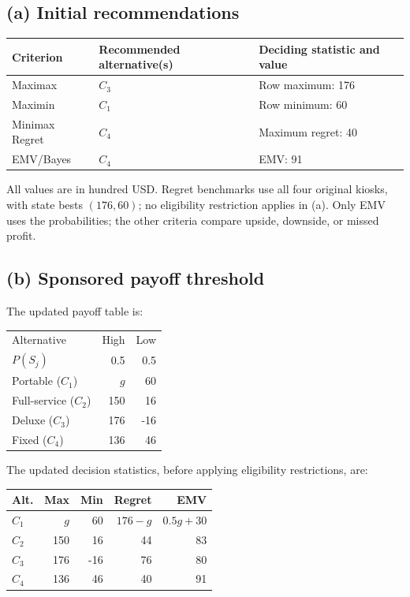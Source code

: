 \subsection*{(a) Initial recommendations }
\begin{center}
\begin{tabular}{lll}\toprule
Criterion & Recommended alternative(s) & Deciding statistic and value\\ \midrule
		Maximax & $C_3$ & Row maximum: 176\\
		Maximin & $C_1$ & Row minimum: 60\\
		Minimax Regret & $C_4$ & Maximum regret: 40\\
		EMV/Bayes & $C_4$ & EMV: 91\\
		\bottomrule\end{tabular}
\end{center}
All values are in hundred USD. Regret benchmarks use all four original kiosks, with state bests $(176,60)$; no eligibility restriction applies in (a). Only EMV uses the probabilities; the other criteria compare upside, downside, or missed profit.
\secInicio[sec:q2]



\label{sol:q2b}
\subsection*{(b) Sponsored payoff threshold }

The updated payoff table is:

\begin{center}\small\setlength{\tabcolsep}{4pt}
	\begin{tabular}{lrr}\toprule
		Alternative & High & Low\\
		$P(S_j)$ & 0.5 & 0.5\\ \midrule
				Portable ($C_1$) & $g$ & 60\\
		Full-service ($C_2$) & 150 & 16\\
		Deluxe ($C_3$) & 176 & -16\\
		Fixed ($C_4$) & 136 & 46\\
		\bottomrule
	\end{tabular}
\end{center}

The updated decision statistics, before applying
eligibility restrictions, are:

\begin{center}\small\setlength{\tabcolsep}{4pt}
	\begin{tabular}{lrrrr}\toprule
		Alt. & Max & Min & Regret & EMV\\ \midrule
				$C_1$ & $g$ & 60 & $176-g$ & $0.5g+30$\\
		$C_2$ & 150 & 16 & 44 & 83\\
		$C_3$ & 176 & -16 & 76 & 80\\
		$C_4$ & 136 & 46 & 40 & 91\\
		\bottomrule
	\end{tabular}
\end{center}

